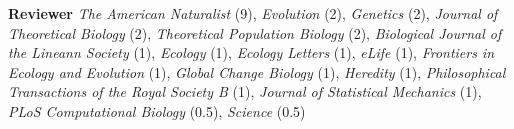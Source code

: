 \documentclass[12pt]{article}
\begin{document}
\noindent \textbf{Reviewer} \textit{The American Naturalist} (9), \textit{Evolution} (2), \textit{Genetics} (2), \textit{Journal of Theoretical Biology} (2), \textit{Theoretical Population Biology} (2), \textit{Biological Journal of the Lineann Society} (1), \textit{Ecology} (1), \textit{Ecology Letters} (1), \textit{eLife} (1), \textit{Frontiers in Ecology and Evolution} (1), \textit{Global Change Biology} (1), \textit{Heredity} (1), \textit{Philosophical Transactions of the Royal Society B} (1), \textit{Journal of Statistical Mechanics} (1), \textit{PLoS Computational Biology} (0.5), \textit{Science} (0.5)

%
\end{document}
